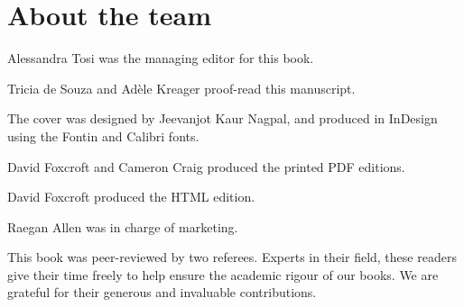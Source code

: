 \documentclass[
  a4paper,
]{book}
\begin{document}
\backmatter

\printendnotes
\newpage

\chapter{About the team}

Alessandra Tosi was the managing editor for this book.

Tricia de Souza and Adèle Kreager proof-read this manuscript.

The cover was designed by Jeevanjot Kaur Nagpal, and produced in InDesign using the Fontin and Calibri fonts.

David Foxcroft and Cameron Craig produced the printed PDF editions. 

David Foxcroft produced the HTML edition.

Raegan Allen was in charge of marketing.

This book was peer-reviewed by two referees. Experts in their field, these readers give their time freely to help ensure the academic rigour of our books. We are grateful for their generous and invaluable contributions.

\newpage


%
\end{document}
